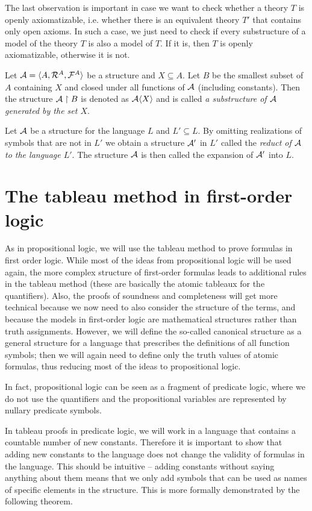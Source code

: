 The last observation is important in case we want to check whether a theory $T$ is openly axiomatizable, i.e. whether there is an equivalent theory $T'$ that contains only open axioms. In such a case, we just need to check if every substructure of a model of the theory $T$ is also a model of $T$. If it is, then $T$ is openly axiomatizable, otherwise it is not.

Let $\mathcal{A} = \langle A, \mathcal{R}^A, \mathcal{F}^A \rangle$ be a structure and $X \subseteq A$. Let $B$ be the smallest subset of $A$ containing $X$ and closed under all functions of $\mathcal{A}$ (including constants). Then the structure $\mathcal{A} \upharpoonright B$ is denoted as $\mathcal{A}\langle X \rangle$ and is called \emph{a substructure of $\mathcal{A}$ generated by the set $X$}. 

Let $\mathcal{A}$ be a structure for the language $L$ and $L'\subseteq L$. By omitting realizations of symbols that are not in $L'$ we obtain a structure $\mathcal{A}'$ in $L'$ called the \emph{reduct of $\mathcal{A}$ to the language $L'$}. The structure $\mathcal{A}$ is then called the expansion of $\mathcal{A}'$ into $L$.

\chapter{The tableau method in first-order logic}

As in propositional logic, we will use the tableau method to prove formulas in first order logic. While most of the ideas from propositional logic will be used again, the more complex structure of first-order formulas leads to additional rules in the tableau method (these are basically the atomic tableaux for the quantifiers). Also, the proofs of soundness and completeness will get more technical because we now need to also consider the structure of the terms, and because the models in first-order logic are mathematical structures rather than truth assignments. However, we will define the so-called canonical structure as a general structure for a language that prescribes the definitions of all function symbols; then we will again need to define only the truth values of atomic formulas, thus reducing most of the ideas to propositional logic.

In fact, propositional logic can be seen as a fragment of predicate logic, where we do not use the quantifiers and the propositional variables are represented by nullary predicate symbols.

In tableau proofs in predicate logic, we will work in a language that contains a countable number of new constants. Therefore it is important to show that adding new constants to the language does not change the validity of formulas in the language. This should be intuitive -- adding constants without saying anything about them means that we only add symbols that can be used as names of specific elements in the structure. This is more formally demonstrated by the following theorem.

